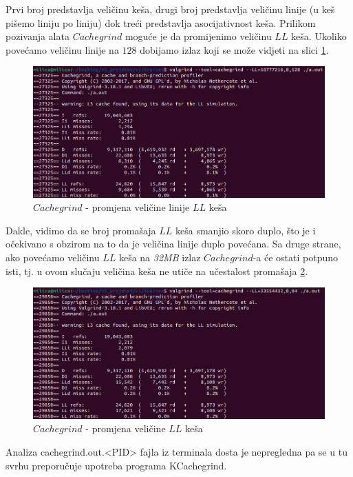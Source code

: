 \documentclass[a4paper]{article}
\begin{document}
Prvi broj predstavlja veličinu keša, drugi broj predstavlja veličinu linije (u keš pišemo liniju po liniju) dok treći predstavlja asocijativnost keša. Prilikom pozivanja alata $Cachegrind$ moguće je da promijenimo veličinu $LL$ keša. Ukoliko povećamo veličinu linije na $128$ dobijamo izlaz koji se može vidjeti na slici \ref{fig:cache4}.
	\begin{figure}[h!]
		\centering
		\caption{$Cachegrind$ - promjena veličine linije $LL$ keša}
		\label{fig:cache4}
		\includegraphics[scale=0.4]{cache4.png}
	\end{figure}
	
Dakle, vidimo da se broj promašaja $LL$ keša smanjio skoro duplo, što je i očekivano s obzirom na to da je veličina linije duplo povećana.
Sa druge strane, ako povećamo veličinu $LL$ keša na \textit{32MB} izlaz $Cachegrind$-a će ostati potpuno isti, tj. u ovom slučaju veličina keša ne utiče na učestalost promašaja \ref{fig:cache5}.
	\begin{figure}[h!]
		\caption{$Cachegrind$ - promjena veličine $LL$ keša}
		\label{fig:cache5}
		\includegraphics[scale=0.4]{cache5.png}
	\end{figure}

Analiza cachegrind.out.<PID> fajla iz terminala dosta je nepregledna pa se u tu svrhu preporučuje upotreba programa KCachegrind. 
\end{document}
